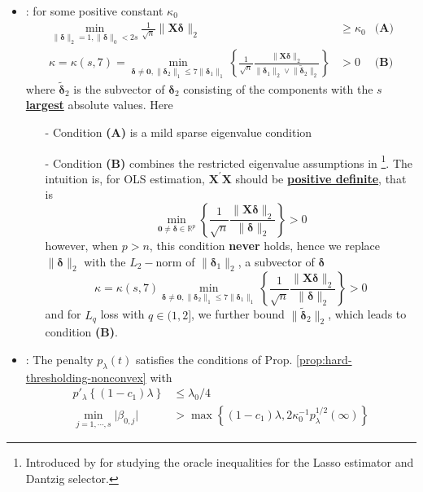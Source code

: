 \documentclass[twoside]{article}
\begin{document}
\begin{itemize}
    \item {}: for some positive constant $\kappa_0$ 
    \begin{align*}
        \min_{\lVert\boldsymbol{\delta}\rVert _2=1,\lVert\boldsymbol{\delta}\rVert _0<2s}\frac{1}{\sqrt{n}}\lVert\mathbf{X}\boldsymbol{\delta}\rVert _2 &\geq \kappa_0 & \textbf{(A)} \\
        \kappa = \kappa(s,7) = \min_{\boldsymbol{\delta}\neq \mathbf{0}, \lVert\boldsymbol{\delta}_2\rVert _1 \leq 7 \lVert\boldsymbol{\delta}_1\rVert _1} \left\{ \frac{1}{\sqrt{n}}\frac{\lVert\mathbf{X}\boldsymbol{\delta}\rVert _2}{\lVert\boldsymbol{\delta}_1\rVert _2 \vee \lVert\tilde{\boldsymbol{\delta}}_2\rVert _2} \right\} &> 0 & \textbf{(B)}
    \end{align*}
    where $\tilde{\boldsymbol{\delta}}_2$ is the subvector of $\boldsymbol{\delta}_2$ consisting of the components with the $s$ \textbf{\underline{largest}} absolute values. Here
    \begin{itemize}
        \item[-] Condition \textbf{(A)} is a mild sparse eigenvalue condition
        \item[-] Condition \textbf{(B)} combines the restricted eigenvalue assumptions in \citet{bickel2009simultaneous}\footnote{Introduced by \citet{candes2007dantzig} for studying the oracle inequalities for the Lasso estimator and Dantzig selector.}. The intuition is, for OLS estimation, $\mathbf{X}^{\prime}\mathbf{X}$ should be \textbf{\underline{positive definite}}, that is $$ \min_{\mathbf{0}\neq \boldsymbol{\delta}\in\mathbb{R}^p}\left\{ \frac{1}{\sqrt{n}} \frac{\lVert  \mathbf{X} \boldsymbol{\delta} \rVert _2}{\lVert \boldsymbol{\delta} \rVert _2} \right\} >0 $$
        however, when $p>n$, this condition \textbf{never} holds, hence we replace $\lVert \boldsymbol{\delta} \rVert _2$ with the $L_2-$norm of $\lVert \boldsymbol{\delta}_1 \rVert _2$, a subvector of $\boldsymbol{\delta}$ 
        $$ \kappa = \kappa(s,7) \min_{\boldsymbol{\delta}\neq \mathbf{0}, \lVert\boldsymbol{\delta}_2\rVert _1 \leq 7 \lVert\boldsymbol{\delta}_1\rVert _1}\left\{ \frac{1}{\sqrt{n}} \frac{\lVert  \mathbf{X} \boldsymbol{\delta} \rVert _2}{\lVert \boldsymbol{\delta} \rVert _2} \right\} >0 $$
        and for $L_q$ loss with $q\in (1,2]$, we further bound $ \lVert\tilde{\boldsymbol{\delta}}_2\rVert _2$, which leads to condition \textbf{(B)}.
    \end{itemize}
    \item {}: The penalty $p_{\lambda}(t)$ satisfies the conditions of Prop. \ref{prop:hard-thresholding-nonconvex} with 
    \begin{align*}
        p'_{\lambda}\left\{ (1-c_1) \lambda \right\} &\leq \lambda_0/4 \\
        \min_{j=1,\cdots,s}\lvert\beta_{0,j}\rvert &> \max\left\{ (1-c_1)\lambda,2\kappa_0^{-1}p_{\lambda}^{1/2}(\infty) \right\}
    \end{align*} 
\end{itemize}
\end{document}
